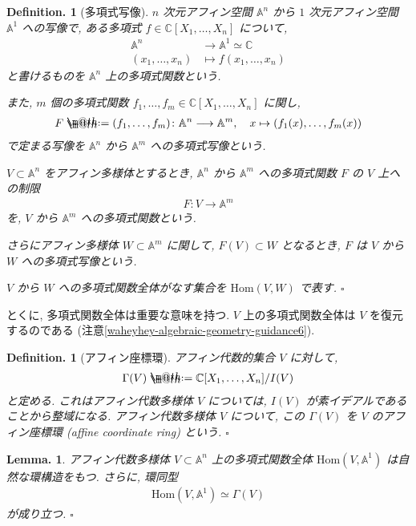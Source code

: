 \documentclass[openany, a4paper, oneside]{jsbook}
\makeatletter
\newcommand*{\defeq}{\mathrel{\rlap{%
\raisebox{0.3ex}{$\m@th\cdot$}}%
\raisebox{-0.3ex}{$\m@th\cdot$}}%
=}
\theoremstyle{break}
\theoremstyle{breakdefn}
\newtheorem{lem}[thm]{Lemma.}
\newtheorem{defn}[thm]{Definition.}
\newcommand{\fin}{\hfill $\square$ \par}
\newcommand{\homo}{\mathrm{Hom}}
\newcommand{\map}{\longrightarrow}
\makeatother
\begin{document}
\begin{defn}[多項式写像]
$n$ 次元アフィン空間 $\mathbb{A}^n$ から $1$ 次元アフィン空間 $\mathbb{A}^1$ への写像で,
ある多項式 $f \in \mathbb{C}[X_1,\dots,X_n]$ について,
\begin{align}
 \mathbb{A}^n
 &\map
 \mathbb{A}^1
 \simeq
 \mathbb{C} \\
 (x_1,\dots,x_n)
 &\longmapsto
 f (x_1,\dots,x_n)
\end{align}
と書けるものを $\mathbb{A}^n$ 上の多項式関数という.

また, $m$ 個の多項式関数 $f_1,\dots,f_m \in \mathbb{C}[X_1,\dots,X_n]$ に関し,
\begin{align}
 F
 \defeq
 (f_1,\dots,f_m) \colon \mathbb{A}^n \map \mathbb{A}^m, \quad x \mapsto (f_1 (x),\dots,f_m (x))
\end{align}
で定まる写像を $\mathbb{A}^n$ から $\mathbb{A}^m$ への多項式写像という.

$V \subset \mathbb{A}^n$ をアフィン多様体とするとき,
$\mathbb{A}^n$ から $\mathbb{A}^m$ への多項式関数 $F$ の $V$ 上への制限
\begin{align}
 F \colon V \map \mathbb{A}^m
\end{align}
を, $V$ から $\mathbb{A}^m$ への多項式関数という.

さらにアフィン多様体 $W \subset \mathbb{A}^m$ に関して, $F (V) \subset W$ となるとき, $F$ は $V$ から $W$ への多項式写像という.

$V$ から $W$ への多項式関数全体がなす集合を $\homo (V,W)$ で表す. \fin
\end{defn}
とくに, 多項式関数全体は重要な意味を持つ.
$V$ 上の多項式関数全体は $V$ を復元するのである (注意\ref{waheyhey-algebraic-geometry-guidance6}).
\begin{defn}[アフィン座標環]
アフィン代数的集合 $V$ に対して,
\begin{align}
 \Gamma ( V )
 \defeq
 \mathbb{C}[X_1, \dots, X_n] /  I ( V )
\end{align}
と定める.
これはアフィン代数多様体 $V$ については, $I (V)$ が素イデアルであることから整域になる.
アフィン代数多様体 $V$ について, この $\Gamma (V)$ を $V$ のアフィン座標環 (affine coordinate ring) という. \fin
\end{defn}
\begin{lem}
アフィン代数多様体 $V \subset \mathbb{A}^n$ 上の多項式関数全体 $\homo (V,\mathbb{A}^1)$ は自然な環構造をもつ.
さらに, 環同型
\begin{align}
 \homo (V, \mathbb{A}^1)
 \simeq
 \Gamma (V)
\end{align}
が成り立つ. \fin
\end{lem}
\end{document}
